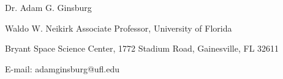 \begin{center}
{\large Dr. Adam G. Ginsburg}\\
\par Waldo W. Neikirk Associate Professor, University of Florida
\par Bryant Space Science Center,
1772 Stadium Road,
Gainesville, FL 32611
\par E-mail: adamginsburg@ufl.edu %
\end{center}

